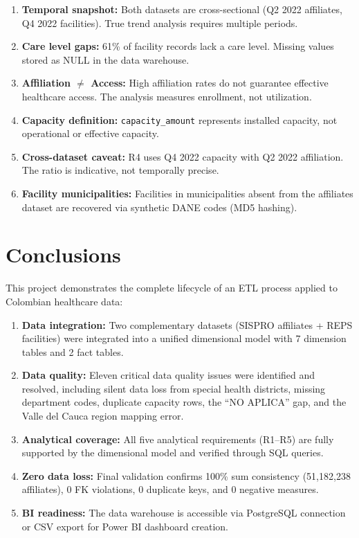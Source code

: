 \documentclass[12pt,a4paper]{article}
\begin{document}
\begin{enumerate}[nosep]
    \item \textbf{Temporal snapshot:} Both datasets are cross-sectional (Q2 2022 affiliates, Q4 2022 facilities). True trend analysis requires multiple periods.
    \item \textbf{Care level gaps:} 61\% of facility records lack a care level. Missing values stored as NULL in the data warehouse.
    \item \textbf{Affiliation $\neq$ Access:} High affiliation rates do not guarantee effective healthcare access. The analysis measures enrollment, not utilization.
    \item \textbf{Capacity definition:} \texttt{capacity\_amount} represents installed capacity, not operational or effective capacity.
    \item \textbf{Cross-dataset caveat:} R4 uses Q4 2022 capacity with Q2 2022 affiliation. The ratio is indicative, not temporally precise.
    \item \textbf{Facility municipalities:} Facilities in municipalities absent from the affiliates dataset are recovered via synthetic DANE codes (MD5 hashing).
\end{enumerate}

\section{Conclusions}

This project demonstrates the complete lifecycle of an ETL process applied to Colombian healthcare data:

\begin{enumerate}[nosep]
    \item \textbf{Data integration:} Two complementary datasets (SISPRO affiliates + REPS facilities) were integrated into a unified dimensional model with 7 dimension tables and 2 fact tables.
    \item \textbf{Data quality:} Eleven critical data quality issues were identified and resolved, including silent data loss from special health districts, missing department codes, duplicate capacity rows, the ``NO APLICA'' gap, and the Valle del Cauca region mapping error.
    \item \textbf{Analytical coverage:} All five analytical requirements (R1--R5) are fully supported by the dimensional model and verified through SQL queries.
    \item \textbf{Zero data loss:} Final validation confirms 100\% sum consistency (51,182,238 affiliates), 0 FK violations, 0 duplicate keys, and 0 negative measures.
    \item \textbf{BI readiness:} The data warehouse is accessible via PostgreSQL connection or CSV export for Power BI dashboard creation.
\end{enumerate}
\end{document}
